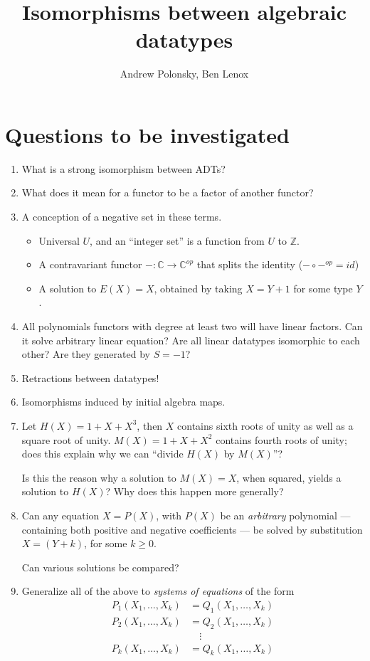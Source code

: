 \documentclass[letterpaper,numbers=enddot]{scrartcl}
\title{Isomorphisms between algebraic datatypes}
\author{Andrew Polonsky, Ben Lenox}
\newcommand{\cat}{\mathbb{C}}
\newcommand{\op}{{op}}
\begin{document}
\maketitle

\section{Questions to be investigated}

\begin{enumerate}
  \item What is a strong isomorphism between ADTs?
  \item What does it mean for a functor to be a factor of another functor?
  \item A conception of a negative set in these terms.
  \begin{itemize}
    \item Universal $U$, and an ``integer set'' is a function from $U$ to $\mathbb{Z}$.
    \item A contravariant functor $- : \cat \to \cat^\op$ that splits the identity
    ($- \circ -^\op = id$)
    \item A solution to $E(X)=X$, obtained by taking $X = Y + 1$ for some type $Y$.
  \end{itemize}
  \item All polynomials functors with degree at least two will have linear factors.
  Can it solve arbitrary linear equation?
  Are all linear datatypes isomorphic to each other?  Are they generated by $S = -1$?
  \item Retractions between datatypes!
  \item Isomorphisms induced by initial algebra maps.
  \item Let $H(X) = 1 + X + X^3$, then $X$ contains sixth roots of unity as well as
  a square root of unity.  $M(X) = 1 + X + X^2$ contains fourth roots of unity;
  does this explain why we can ``divide $H(X)$ by $M(X)$''?

  Is this the reason why a solution to $M(X)=X$, when squared, yields a solution to $H(X)$?
  Why does this happen more generally?
  \item Can any equation $X=P(X)$, with $P(X)$ be an \emph{arbitrary}
  polynomial --- containing both positive and negative coefficients ---
  be solved by substitution $X = (Y+k)$, for some $k \ge 0$.

  Can various solutions be compared?

  \item Generalize all of the above to \emph{systems of equations} of the form
  \begin{align*}
    P_1(X_1,\dots,X_k) &= Q_1(X_1,\dots,X_k)\\
    P_2(X_1,\dots,X_k) &= Q_2(X_1,\dots,X_k)\\
     &\quad \vdots \\
    P_k(X_1,\dots,X_k) &= Q_k(X_1,\dots,X_k)
  \end{align*}
\end{enumerate}
\end{document}
